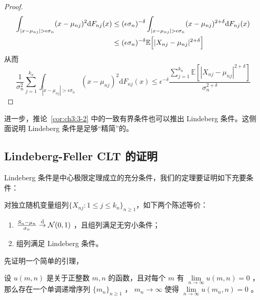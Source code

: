 \begin{proof}
\[\begin{aligned} \int_{|x-\mu_{nj}|>\epsilon\sigma_n}  (x - \mu_{nj})^2 \mathrm{d}F_{nj}(x)  &\le (\epsilon \sigma_n)^{-\delta} \int_{|x - \mu_{nj}| > \epsilon \sigma_n} (x - \mu_{nj})^{2+\delta} {\rm d}F_{nj}(x) \\ &\le (\epsilon \sigma_n)^{-\delta} \mathbb{E}\Big[|X_{nj} - \mu_{nj}|^{2+\delta}\Big] \end{aligned}\]
从而
\[\frac1{\sigma_n^2}\sum_{j=1}^{k_n}\int_{|x-\mu_{nj}|>\epsilon\sigma_n}  (x - \mu_{nj})^2 \mathrm{d}F_{nj}(x) \le \epsilon^{-\delta}\frac{\sum\limits_{j=1}^{k_n}\mathbb{E}\left[|X_{nj}-\mu_{nj}|^{2+\delta}\right]}{\sigma_n^{2+\delta}}\]
\end{proof}

进一步，推论~\ref{cor:ch3:3-2} 中的一致有界条件也可以推出 Lindeberg 条件。这侧面说明 Lindeberg 条件是足够``精简''的。

\subsection{Lindeberg-Feller CLT 的证明}

Lindeberg 条件是中心极限定理成立的充分条件，我们的定理要证明如下充要条件：

\begin{theorem}\label{thm:ch3:lindeberg-feller}

\label{thm:ch3:3-11}

对独立随机变量组列$\{X_{nj} : 1 \leq j \leq k_n\}_{n \geq 1}$，如下两个陈述等价：

\begin{enumerate}
\def\labelenumi{\arabic{enumi}.}
\tightlist
\item
  $\frac{S_n-\mu_n}{\sigma_n}\overset{\rm d}\to \mathcal{N}(0,1)$ ，且组列满足无穷小条件；
\item
  组列满足 Lindeberg 条件。
\end{enumerate}

\end{theorem}

先证明一个简单的引理，

\begin{lemma}

\label{lem:ch3:3-12}

设 $u(m,n)$ 是关于正整数 $m,n$ 的函数，且对每个 $m$ 有 $\lim\limits_{n\to\infty}u(m,n)=0$ ，那么存在一个单调递增序列 $\{m_n\}_{n\ge 1}$ ， $m_n\to\infty$ 使得 $\lim\limits_{n\to\infty}u(m_n,n)=0$ 。

\end{lemma}

